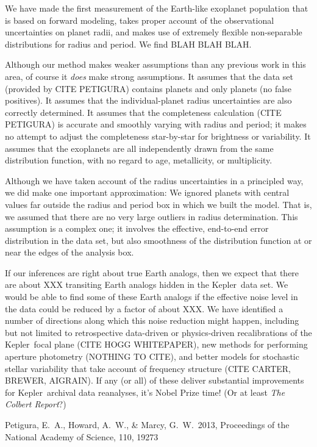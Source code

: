 \documentclass[12pt,preprint]{aastex}
\newcommand{\project}[1]{{\sffamily #1}}
\newcommand{\kepler}{\project{Kepler}}
\newcommand{\foreign}[1]{\emph{#1}}
\newcommand{\etal}{\foreign{et\,al.}}
\begin{document}
We have made the first measurement of the Earth-like exoplanet population
  that is based on forward modeling,
  takes proper account of the observational uncertainties on planet radii,
  and makes use of extremely flexible non-separable distributions for radius and period.
We find BLAH BLAH BLAH.

Although our method makes weaker assumptions than any previous work in this area,
  of course it \emph{does} make strong assumptions.
It assumes that the data set (provided by CITE PETIGURA)
  contains planets and only planets (no false positives).
It assumes that the individual-planet radius uncertainties
  are also correctly determined.
It assumes that the completeness calculation (CITE PETIGURA)
  is accurate and smoothly varying with radius and period;
  it makes no attempt to adjust the completeness star-by-star for brightness or variability.
It assumes that the exoplanets are all independently drawn from the same distribution function,
  with no regard to age, metallicity, or multiplicity.

Although we have taken account of the radius uncertainties in a principled way,
  we did make one important approximation:
We ignored planets with central values far outside the radius and period box in which we built the model.
That is, we assumed that there are no very large outliers in radius determination.
This assumption is a complex one;
  it involves the effective, end-to-end error distribution in the data set,
  but also smoothness of the distribution function at or near the edges of the analysis box.

If our inferences are right about true Earth analogs,
  then we expect that there are about XXX transiting Earth analogs
  hidden in the \kepler\ data set.
We would be able to find some of these Earth analogs if the effective noise level in the data could be reduced
  by a factor of about XXX.
We have identified a number of directions along which this noise reduction
might happen, including but not limited to retrospective data-driven or
physics-driven recalibrations of the \kepler\ focal plane (CITE HOGG
WHITEPAPER), new methods for performing aperture photometry (NOTHING TO CITE),
and better models for stochastic stellar variability that take account of
frequency structure (CITE CARTER, BREWER, AIGRAIN).
If any (or all) of these deliver substantial improvements for \kepler\
archival data reanalyses, it's Nobel Prize time!  (Or at least \textsl{The
Colbert Report}?)

\newcommand{\arxiv}[1]{\href{http://arxiv.org/abs/#1}{arXiv:#1}}
\begin{thebibliography}{}\raggedright

\bibitem[Petigura \etal(2013)]{petigura}
Petigura, E.~A., Howard, A.~W., \& Marcy, G.~W.\ 2013,
Proceedings of the National Academy of Science, 110, 19273

\end{thebibliography}
\end{document}
